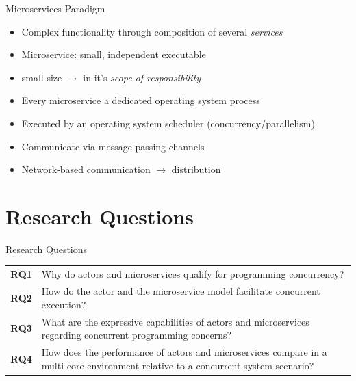 \documentclass{beamer}
\begin{document}

\begin{frame}{Microservices Paradigm}

\begin{itemize}
  \item Complex functionality through composition of several \textit{services}
  \item Microservice: small, independent executable
  \item \glqq small\grqq{} size $\rightarrow$ in it's \textit{scope of responsibility}
  \item Every microservice a dedicated operating system process
  \item Executed by an operating system scheduler (concurrency/parallelism)
  \item Communicate via message passing channels
  \item Network-based communication $\rightarrow$ distribution
\end{itemize}

\end{frame}


\section{Research Questions}


\begin{frame}{Research Questions}

\pause

\begin{table}
  \begin{tabularx}{\textwidth}{lX}                                                                                                                    \\[10pt]%
    \textbf{RQ1} & Why do actors and microservices qualify for programming concurrency?                                                               \\[10pt]%
    \textbf{RQ2} & How do the actor and the microservice model facilitate concurrent execution?                                                       \\[10pt]%
    \textbf{RQ3} & What are the expressive capabilities of actors and microservices regarding concurrent programming concerns?                        \\[10pt]%
    \textbf{RQ4} & How does the performance of actors and microservices compare in a multi-core environment relative to a concurrent system scenario?
  \end{tabularx}
\end{table}

\end{frame}
\end{document}
